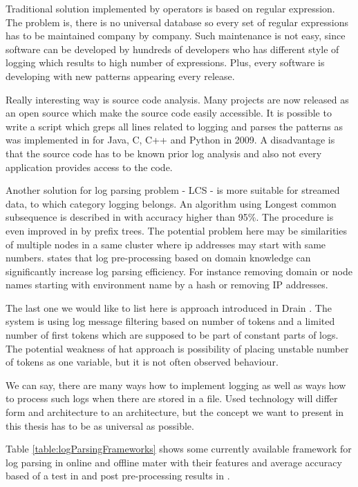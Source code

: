Traditional solution implemented by operators is based on regular expression. The problem is, there is no universal database so every set of regular expressions has to be maintained company by company. Such maintenance is not easy, since software can be developed by hundreds of developers who has different style of logging which results to high number of expressions. Plus, every software is developing with new patterns appearing every release.

Really interesting way is source code analysis. Many projects are now released as an open source which make the source code easily accessible. It is possible to write a script which greps all lines related to logging and parses the patterns as was implemented in \cite{xu2009detecting} for Java, C, C++ and Python in 2009. A disadvantage is that the source code has to be known prior log analysis and also not every application provides access to the code. 

Another solution for log parsing problem - LCS - is more suitable for streamed data, to which category logging belongs. An algorithm using Longest common subsequence is described in \cite{fu2009execution} with accuracy higher than 95\%. The procedure is even improved in \cite{du2016spell} by prefix trees. The potential problem here may be similarities of multiple nodes in a same cluster where ip addresses may start with same numbers. \cite{he2016evaluation} states that log pre-processing based on domain knowledge can significantly increase log parsing efficiency. For instance removing domain or node names starting with environment name by a hash or removing IP addresses.

The last one we would like to list here is approach introduced in Drain \cite{he2017drain}. The system is using log message filtering based on number of tokens and a limited number of first tokens which are supposed to be part of constant parts of logs. The potential weakness of hat approach is possibility of placing unstable number of tokens as one variable, but it is not often observed behaviour. 

We can say, there are many ways how to implement logging as well as ways how to process such logs when there are stored in a file. Used technology will differ form and architecture to an architecture, but the concept we want to present in this thesis has to be as universal as possible.

Table \ref{table:logParsingFrameworks} shows some currently available framework for log parsing in online and offline mater with their features and average accuracy based of a test in \cite{he2017drain} and post pre-processing results in \cite{he2016evaluation}.

